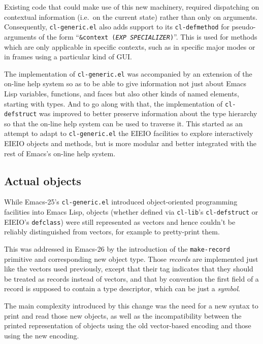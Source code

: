 \documentclass[format=acmsmall, review]{acmart}
\newcommand \Elisp {Emacs Lisp}
\begin{document}
Existing code that could make use of this new machinery,
required dispatching on contextual information
(i.e.\ on the current state) rather than only on arguments.
Consequently, \texttt{cl-generic.el} also adds support to its \texttt{cl-defmethod} for
pseudo-arguments of the form ``\texttt{\&context (\textsl{EXP}
  \textsl{SPECIALIZER})}''.  This is used for methods which are only
applicable in specific contexts, such as in specific major modes or in
frames using a particular kind of GUI.

The implementation of \texttt{cl-generic.el} was accompanied by an extension
of the on-line help system so as to be able to give information not just
about \Elisp{} variables, functions, and faces but also other kinds of named
elements, starting with types.  And to go along with that, the implementation
of \texttt{cl-defstruct} was improved to better preserve information about
the type hierarchy so that the on-line help system can be used to traverse
it.  This started as an attempt to adapt to \texttt{cl-generic.el} the EIEIO
facilities to explore interactively EIEIO objects and methods, but is more
modular and better integrated with the rest of Emacs's on-line help system.

\subsection{Actual objects}  %
\label{sec:actual-objects}

While Emacs-25's \texttt{cl-generic.el} introduced object-oriented
programming facilities into \Elisp{}, objects (whether defined via
\texttt{cl-lib}'s \texttt{cl-defstruct} or EIEIO's \texttt{defclass}) were
still represented as vectors and hence couldn't be reliably distinguished
from vectors, for example to pretty-print them.

This was addressed in Emacs-26 by the introduction of the
\texttt{make-record} primitive and corresponding new object type.
Those \emph{records} are implemented just like the vectors used previously,
except that their tag indicates that they should be treated as records
instead of vectors, and that by convention the first field of a record is
supposed to contain a type descriptor, which can be just a \emph{symbol}.

The main complexity introduced by this change was the need for a new syntax
to print and read those new objects, as well as the incompatibility between
the printed representation of objects using the old vector-based encoding
and those using the new encoding.
\end{document}
